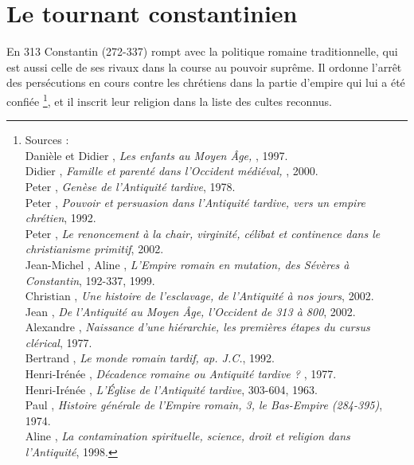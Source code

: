 

\chapter{Le tournant constantinien}

En 313  Constantin (272-337) rompt avec la politique romaine traditionnelle, qui est aussi celle de ses rivaux dans la course au pouvoir suprême. Il ordonne l'arrêt des persécutions en cours contre les chrétiens dans la partie d'empire qui lui a été confiée \footnote{Sources :
\\Danièle  et Didier , \emph{Les enfants au Moyen Âge, }, 1997.
\\Didier {}, \emph{Famille et parenté dans l'Occident médiéval, }, 2000.
\\Peter {}, \emph{Genèse de l'Antiquité tardive}, 1978.
\\Peter {}, \emph{Pouvoir et persuasion dans l'Antiquité tardive, vers un empire chrétien}, 1992.
\\Peter {}, \emph{Le renoncement à la chair, virginité, célibat et continence dans le christianisme primitif}, 2002.
\\Jean-Michel , Aline , \emph{L'Empire romain en mutation, des Sévères à Constantin}, 192-337, 1999.
\\Christian {}, \emph{Une histoire de l'esclavage, de l'Antiquité à nos jours}, 2002.
\\Jean {}, \emph{De l'Antiquité au Moyen Âge, l'Occident de 313 à 800}, 2002.
\\Alexandre {}, \emph{Naissance d'une hiérarchie, les premières étapes du cursus clérical}, 1977.
\\Bertrand {}, \emph{Le monde romain tardif,  ap. J.C.}, 1992.
\\Henri-Irénée , \emph{Décadence romaine ou Antiquité tardive ? }, 1977.
\\Henri-Irénée , \emph{L'Église de l'Antiquité tardive}, 303-604, 1963.
\\Paul {}, \emph{Histoire générale de l'Empire romain, 3, le Bas-Empire (284-395)}, 1974.
\\Aline {}, \emph{La contamination spirituelle, science, droit et religion dans l'Antiquité}, 1998.},
et il inscrit leur religion dans la liste des cultes reconnus. 

